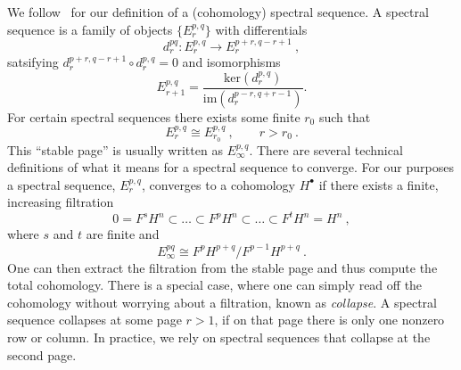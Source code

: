 \documentclass[a4paper]{article}
\begin{document}
We follow~\cite{Weibel:1994} for our definition of a (cohomology) spectral sequence. A spectral sequence is a family of objects $\{E_{r}^{p,q}\}$ with differentials
\begin{equation}
	d_r^{pq}:E_{r}^{p,q}\rightarrow E_{r}^{p+r,q-r+1}~,
\end{equation}
satsifying $d^{p+r,q-r+1}_r\circ d^{p,q}_r=0$ and isomorphisms
\begin{equation}
	E^{p,q}_{r+1} =\frac{ \mathrm{ker}(d_{r}^{p,q})}{\mathrm{im}(d_r^{p-r,q+r-1})}.
\end{equation}
For certain spectral sequences there exists some finite $r_0$ such that
\begin{equation}
	E_{r}^{p,q}\cong E_{r_0}^{p,q}~,\qquad r > r_0~.
\end{equation}
This ``stable page'' is usually written as $E_\infty^{p,q}$. There are several technical definitions of what it means for a spectral sequence to converge. For our purposes a spectral sequence, $E_r^{p,q}$, converges to a cohomology $H^\bullet$ if there exists a finite, increasing filtration
\begin{equation}
	0 = F^sH^n \subset \dots \subset F^{p}H^n\subset\dots\subset F^tH^n=H^n~,
\end{equation}
where $s$ and $t$ are finite and
\begin{equation}
	E_\infty^{pq} \cong F^pH^{p+q}/F^{p-1}H^{p+q}~.
\end{equation}
One can then extract the filtration from the stable page and thus compute the total cohomology. There is a special case, where one can simply read off the cohomology without worrying about a filtration, known as \textit{collapse}. A spectral sequence collapses at some page $r>1$, if on that page there is only one nonzero row or column. In practice, we rely on spectral sequences that collapse at the second page.
\end{document}
